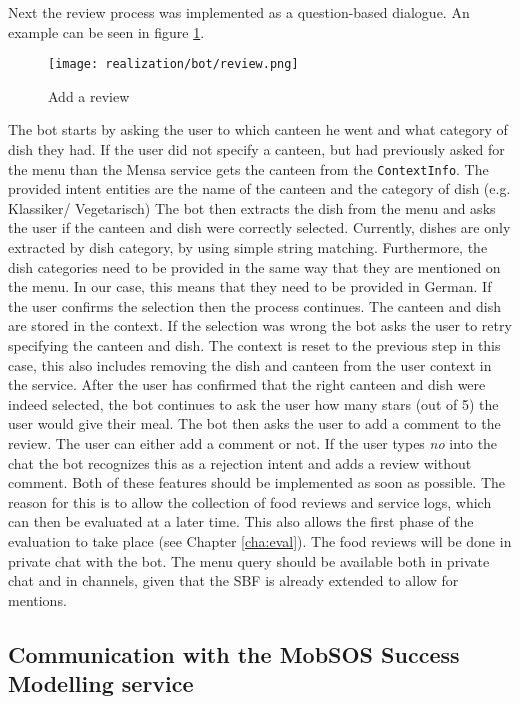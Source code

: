 Next the review process was implemented as a question-based dialogue. An example can be seen in figure \ref{fig:addReview}.

\begin{figure}[h]
    \centering
    \texttt{[image: realization/bot/review.png]}
    \caption{Add a review}
    \label{fig:addReview}
\end{figure}

The bot starts by asking the user to which canteen he went and what category of dish they had. If the user did not specify a canteen, but had previously asked for the menu than the Mensa service gets the canteen from the \texttt{ContextInfo}. 
The provided intent entities are the name of the canteen and the category of dish (e.g. Klassiker/ Vegetarisch) 
The bot then extracts the dish from the menu and asks the user if the canteen and dish were correctly selected. Currently, dishes are only extracted by dish category, by using simple string matching. Furthermore, the dish categories need to be provided in the same way that they are mentioned on the menu. In our case, this means that they need to be provided in German.
If the user confirms the selection then the process continues. The canteen and dish are stored in the context. If the selection was wrong the bot asks the user to retry specifying the canteen and dish. The context is reset to the previous step in this case, this also includes removing the dish and canteen from the user context in the service.
After the user has confirmed that the right canteen and dish were indeed selected, the bot continues to ask the user how many stars (out of 5) the user would give their meal. 
The bot then asks the user to add a comment to the review. The user can either add a comment or not. If the user types \emph{no} into the chat the bot recognizes this as a rejection intent and adds a review without comment.
Both of these features should be implemented as soon as possible. The reason for this is to allow the collection of food reviews and service logs, which can then be evaluated at a later time.
This also allows the first phase of the evaluation to take place (see Chapter \ref{cha:eval}).
The food reviews will be done in private chat with the bot. The menu query should be available both in private chat and in channels, given that the SBF is already extended to allow for mentions.

\subsection{Communication with the MobSOS Success Modelling service}

